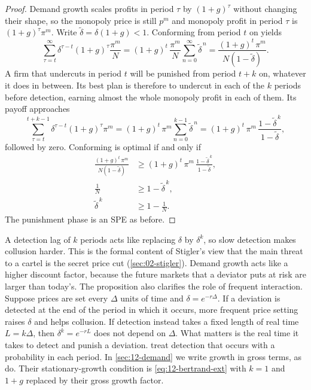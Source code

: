 \begin{proof}
Demand growth scales profits in period $\tau$ by $(1 + g)^{\tau}$ without changing their shape, so the monopoly price
is still $p^m$ and monopoly profit in period $\tau$ is $(1 + g)^{\tau}\pi^m$. Write
$\tilde\delta = \delta(1 + g) < 1$. Conforming from period $t$ on yields
\begin{equation*}
\sum_{\tau = t}^{\infty}\delta^{\tau - t}(1 + g)^{\tau}\frac{\pi^m}{N}
= (1 + g)^t\,\frac{\pi^m}{N}\sum_{n = 0}^{\infty}\tilde\delta^{\,n}
= \frac{(1 + g)^t\,\pi^m}{N(1 - \tilde\delta)} .
\end{equation*}
A firm that undercuts in period $t$ will be punished from period $t + k$ on, whatever it does in between. Its best
plan is therefore to undercut in each of the $k$ periods before detection, earning almost the whole monopoly profit
in each of them. Its payoff approaches
\begin{equation*}
\sum_{\tau = t}^{t + k - 1}\delta^{\tau - t}(1 + g)^{\tau}\pi^m
= (1 + g)^t\,\pi^m\sum_{n = 0}^{k - 1}\tilde\delta^{\,n}
= (1 + g)^t\,\pi^m\,\frac{1 - \tilde\delta^{\,k}}{1 - \tilde\delta} ,
\end{equation*}
followed by zero. Conforming is optimal if and only if
\begin{align*}
\frac{(1 + g)^t\,\pi^m}{N(1 - \tilde\delta)} &\ge (1 + g)^t\,\pi^m\,\frac{1 - \tilde\delta^{\,k}}{1 - \tilde\delta} , \\
\frac{1}{N} &\ge 1 - \tilde\delta^{\,k} , \\
\tilde\delta^{\,k} &\ge 1 - \frac{1}{N} .
\end{align*}
The punishment phase is an SPE as before.
\end{proof}

A detection lag of $k$ periods acts like replacing $\delta$ by $\delta^k$, so slow detection makes collusion harder.
This is the formal content of Stigler's view that the main threat to a cartel is the secret price cut
(\cref{sec:02-stigler}). Demand growth acts like a higher discount factor, because the future markets that a
deviator puts at risk are larger than today's. The proposition also clarifies the role of frequent interaction.
Suppose prices are set every $\Delta$ units of time and $\delta = e^{-r\Delta}$. If a deviation is detected at the end
of the period in which it occurs, more frequent price setting raises $\delta$ and helps collusion. If detection
instead takes a fixed length of real time $L = k\Delta$, then $\delta^k = e^{-rL}$ does not depend on $\Delta$. What
matters is the real time it takes to detect and punish a deviation. 
treat detection that occurs with a probability in each period. In \cref{sec:12-demand} we write growth in gross
terms, as \citet{BagwellStaiger1997} do. Their stationary-growth condition is \eqref{eq:12-bertrand-ext} with $k = 1$
and $1 + g$ replaced by their gross growth factor.

